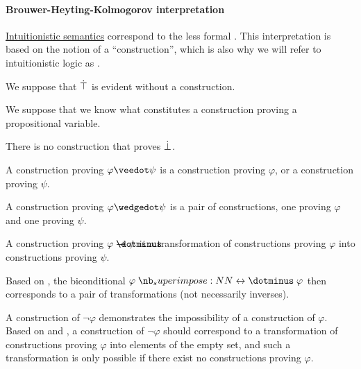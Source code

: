 \paragraph{Brouwer-Heyting-Kolmogorov interpretation}

\begin{concept}\label{con:brouwer_heyting_kolmogorov_interpretation}
  \hyperref[def:propositional_semantics]{Intuitionistic semantics} correspond to the less formal . This interpretation is based on the notion of a \enquote{construction}, which is also why we will refer to intuitionistic logic as .

  \begin{thmenum}
     We suppose that \( \dot\top \) is evident without a construction.

     We suppose that we know what constitutes a construction proving a propositional variable.

     There is no construction that proves \( \dot\bot \).

     A construction proving \( \varphi \synvee \psi \) is a construction proving \( \varphi \), or a construction proving \( \psi \).

     A construction proving \( \varphi \synwedge \psi \) is a pair of constructions, one proving \( \varphi \) and one proving \( \psi \).

     A construction proving \( \varphi \synimplies \psi \) is a transformation of constructions proving \( \varphi \) into constructions proving \( \psi \).

     Based on , the biconditional \( \varphi \syniff \varphi \) then corresponds to a pair of transformations (not necessarily inverses).

     A construction of \( \neg \varphi \) demonstrates the impossibility of a construction of \( \varphi \). Based on  and , a construction of \( \neg \varphi \) should correspond to a transformation of constructions proving \( \varphi \) into elements of the empty set, and such a transformation is only possible if there exist no constructions proving \( \varphi \).
  \end{thmenum}
\end{concept}

